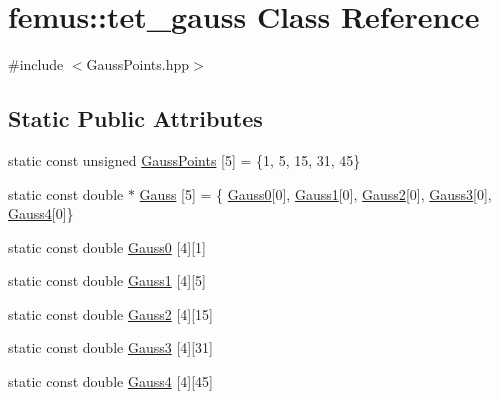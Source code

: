 \hypertarget{classfemus_1_1tet__gauss}{}\section{femus\+:\+:tet\+\_\+gauss Class Reference}
\label{classfemus_1_1tet__gauss}


{\ttfamily \#include $<$Gauss\+Points.\+hpp$>$}

\subsection*{Static Public Attributes}
\begin{DoxyCompactItemize}
\item 
static const unsigned \mbox{\hyperlink{classfemus_1_1tet__gauss_ac81697bdebb713a26af722e439b4c6f7}{Gauss\+Points}} \mbox{[}5\mbox{]} = \{1, 5, 15, 31, 45\}
\item 
static const double $\ast$ \mbox{\hyperlink{classfemus_1_1tet__gauss_a21f2069812fd38525937f4154103607e}{Gauss}} \mbox{[}5\mbox{]} = \{ \mbox{\hyperlink{classfemus_1_1tet__gauss_aa9f4d28a7fca924766bb8cdb19538e44}{Gauss0}}\mbox{[}0\mbox{]}, \mbox{\hyperlink{classfemus_1_1tet__gauss_acdd723265509236ea315d135a54bb59f}{Gauss1}}\mbox{[}0\mbox{]}, \mbox{\hyperlink{classfemus_1_1tet__gauss_a8362fd14ea7673223137a1a979449a9e}{Gauss2}}\mbox{[}0\mbox{]}, \mbox{\hyperlink{classfemus_1_1tet__gauss_a808c1acbb90665d6f95118cd67bdc447}{Gauss3}}\mbox{[}0\mbox{]}, \mbox{\hyperlink{classfemus_1_1tet__gauss_a96a28c287f5d6e91e3df80a4575178ab}{Gauss4}}\mbox{[}0\mbox{]}\}
\item 
static const double \mbox{\hyperlink{classfemus_1_1tet__gauss_aa9f4d28a7fca924766bb8cdb19538e44}{Gauss0}} \mbox{[}4\mbox{]}\mbox{[}1\mbox{]}
\item 
static const double \mbox{\hyperlink{classfemus_1_1tet__gauss_acdd723265509236ea315d135a54bb59f}{Gauss1}} \mbox{[}4\mbox{]}\mbox{[}5\mbox{]}
\item 
static const double \mbox{\hyperlink{classfemus_1_1tet__gauss_a8362fd14ea7673223137a1a979449a9e}{Gauss2}} \mbox{[}4\mbox{]}\mbox{[}15\mbox{]}
\item 
static const double \mbox{\hyperlink{classfemus_1_1tet__gauss_a808c1acbb90665d6f95118cd67bdc447}{Gauss3}} \mbox{[}4\mbox{]}\mbox{[}31\mbox{]}
\item 
static const double \mbox{\hyperlink{classfemus_1_1tet__gauss_a96a28c287f5d6e91e3df80a4575178ab}{Gauss4}} \mbox{[}4\mbox{]}\mbox{[}45\mbox{]}
\end{DoxyCompactItemize}


